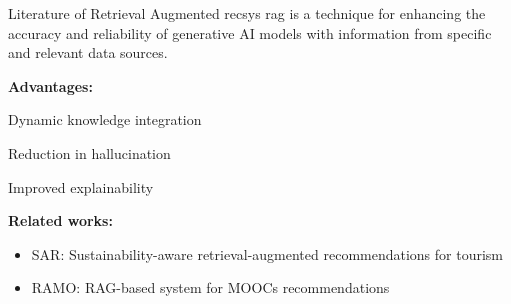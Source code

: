 \begin{tframe}{Literature of Retrieval Augmented \gls{recsys}}
    \gls{rag} is a technique for enhancing the accuracy and reliability of generative AI models with information from specific and relevant data sources.
    
    \vspace{0.2cm}

    \textbf{Advantages:}
    \begin{adv}
        \item Dynamic knowledge integration
        \item Reduction in hallucination
        \item Improved explainability
    \end{adv}
    
    \vspace{0.2cm}

    \textbf{Related works:}
    \begin{itemize}
        \item SAR: Sustainability-aware retrieval-augmented recommendations for tourism~\cite{Banerjee2024}
        \item RAMO: RAG-based system for MOOCs recommendations~\cite{Rao2024}
    \end{itemize}

\end{tframe}